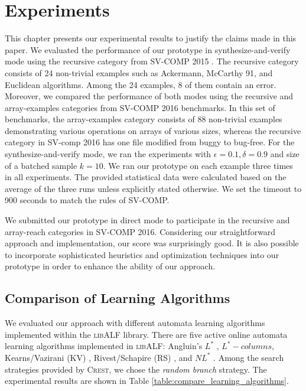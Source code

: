 \newcommand{\Mem}{\textit{Mem} }
\newcommand{\Equ}{\textit{Equ} }
\newcommand{\safe}{S}
\newcommand{\unsafe}{U}
\newcommand{\unknown}{?}
\newcommand{\exception}{E}
\newcommand{\timeout}{T.O.}
\newcommand{\unknownmark}{\ensuremath{^?}}
\newcommand{\wrongmark}{\ensuremath{^!}}

\chapter{Experiments}\label{ch:experiments}

This chapter presents our experimental results to justify the claims made in this paper. We evaluated the performance of our prototype in synthesize-and-verify mode using the recursive category from SV-COMP 2015 \cite{svcomp15} \cite{svcomp-benchmarks}. The recursive category consists of 24 non-trivial examples such as Ackermann, McCarthy 91, and Euclidean algorithms. Among the 24 examples, 8 of them contain an error. Moreover, we compared the performance of both modes using the recursive and array-examples categories from SV-COMP 2016 \cite{svcomp16} benchmarks. In this set of benchmarks, the array-examples category consists of 88 non-trivial examples demonstrating various operations on arrays of various sizes, whereas the recursive category in SV-comp 2016 has one file modified from buggy to bug-free. For the synthesize-and-verify mode, we ran the experiments with $\epsilon = 0.1, \delta = 0.9$ and size of a batched sample $k = 10$. We ran our prototype on each example three times in all experiments. The provided statistical data were calculated based on the average of the three runs unless explicitly stated otherwise. We set the timeout to 900 seconds to match the rules of SV-COMP.  

We submitted our prototype in direct mode to participate in the recursive and array-reach categories in SV-COMP 2016. Considering our straightforward approach and implementation, our score was surprisingly good. It is also possible to incorporate sophisticated heuristics and optimization techniques into our prototype in order to enhance the ability of our approach.

\section{Comparison of Learning Algorithms}\label{sec:compare_learning_algorithms}

We evaluated our approach with different automata learning algorithms implemented within the \textsc{libALF} library. There are five active online automata learning algorithms implemented in \textsc{libALF}: Angluin's $L^\ast$ \cite{Angluin87}, $L^\ast-columns$, Kearns/Vazirani (KV) \cite{KearnsV94}, Rivest/Schapire (RS) \cite{RivestS93}, and $NL^\ast$ \cite{BolligHKL09}. Among the search strategies provided by \textsc{Crest}, we chose the \emph{random branch} strategy. The experimental results are shown in Table \ref{table:compare_learning_algorithms}.

